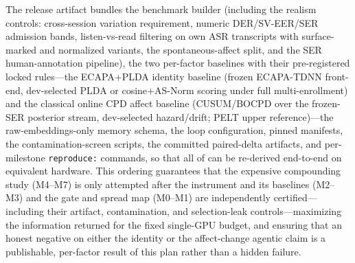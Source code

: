 The release artifact bundles the benchmark builder (including the realism controls: cross-session variation requirement, numeric DER/SV-EER/SER admission bands, listen-vs-read filtering on own ASR transcripts with surface-marked and normalized variants, the spontaneous-affect split, and the SER human-annotation pipeline), the two per-factor baselines with their pre-registered locked rules---the ECAPA$+$PLDA identity baseline (frozen ECAPA-TDNN front-end, dev-selected PLDA or cosine$+$AS-Norm scoring under full multi-enrollment) and the classical online CPD affect baseline (CUSUM/BOCPD over the frozen-SER posterior stream, dev-selected hazard/drift; PELT upper reference)---the raw-embeddings-only memory schema, the loop configuration, pinned manifests, the contamination-screen scripts, the committed paired-delta artifacts, and per-milestone \texttt{reproduce:} commands, so that all of  can be re-derived end-to-end on equivalent hardware. This ordering guarantees that the expensive compounding study (M4--M7) is only attempted after the instrument and its baselines (M2--M3) and the gate and spread map (M0--M1) are independently certified---including their artifact, contamination, and selection-leak controls---maximizing the information returned for the fixed single-GPU budget, and ensuring that an honest negative on either the identity or the affect-change agentic claim is a publishable, per-factor result of this plan rather than a hidden failure.